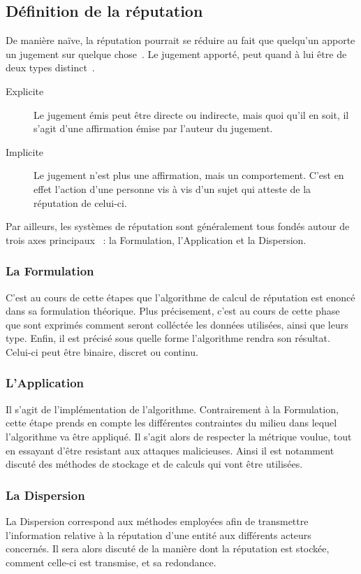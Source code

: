 \documentclass[a4paper, 11pt]{article} %
\begin{document}
\subsection{Définition de la réputation}
De manière naïve, la réputation pourrait se réduire au fait que quelqu'un apporte un jugement sur quelque chose~\cite{FarmerGlass2010}.
Le jugement apporté, peut quand à lui être de deux types distinct~\cite{FarmerGlass2010}.
\begin{description}
	\item[Explicite] Le jugement émis peut être directe ou indirecte, mais quoi qu'il en soit, il s'agit d'une affirmation émise par l'auteur du jugement.
	\item[Implicite] Le jugement n'est plus une affirmation, mais un comportement. C'est en effet l'action d'une personne vis à vis d'un sujet qui atteste de la réputation de celui-ci.
\end{description}

Par ailleurs, les systèmes de réputation sont généralement tous fondés autour de trois axes principaux~\cite{HoffmanZageNita2007} : la Formulation, l'Application et la Dispersion.

\subsubsection{La Formulation}
C'est au cours de cette étapes que l'algorithme de calcul de réputation est enoncé dans sa formulation théorique.
Plus précisement, c'est au cours de cette phase que sont exprimés comment seront colléctée les données utilisées, ainsi que leurs type.
Enfin, il est précisé sous quelle forme l'algorithme rendra son résultat. Celui-ci peut être binaire, discret ou continu.

\subsubsection{L'Application}
Il s'agit de l'implémentation de l'algorithme.
Contrairement à la Formulation, cette étape prends en compte les différentes contraintes du milieu dans lequel l'algorithme va être appliqué.
Il s'agit alors de respecter la métrique voulue, tout en essayant d'être resistant aux attaques malicieuses.
Ainsi il est notamment discuté des méthodes de stockage et de calculs qui vont être utilisées.

\subsubsection{La Dispersion}
La Dispersion correspond aux méthodes employées afin de transmettre l'information relative à la réputation d'une entité aux différents acteurs concernés.
Il sera alors discuté de la manière dont la réputation est stockée, comment celle-ci est transmise, et sa redondance.
\end{document}
